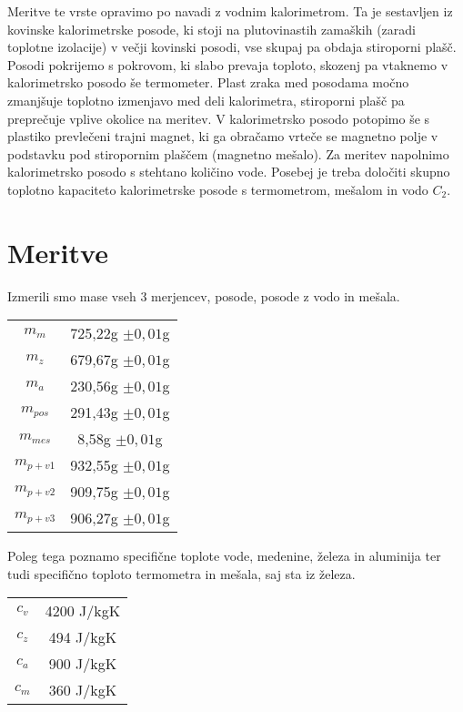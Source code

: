 \documentclass[a4paper]{article}
\begin{document}
Meritve te vrste opravimo po navadi z vodnim kalorimetrom. Ta je sestavljen iz kovinske kalorimetrske posode, ki stoji na plutovinastih zamaških (zaradi toplotne izolacije) v večji kovinski posodi, vse skupaj pa obdaja stiroporni plašč. Posodi pokrijemo s pokrovom, ki slabo prevaja toploto, skozenj pa vtaknemo v kalorimetrsko posodo še termometer. Plast zraka med posodama močno zmanjšuje toplotno izmenjavo med deli kalorimetra, stiroporni plašč pa preprečuje vplive okolice na meritev. V kalorimetrsko posodo potopimo še s plastiko prevlečeni trajni magnet, ki ga obračamo vrteče se magnetno polje v podstavku pod stiropornim plaščem (magnetno mešalo). Za meritev napolnimo kalorimetrsko posodo s stehtano količino vode. Posebej je treba določiti skupno toplotno kapaciteto kalorimetrske posode s termometrom, mešalom in vodo $C_2$.

\section{Meritve}
Izmerili smo mase vseh 3 merjencev, posode, posode z vodo in mešala. 


\begin{center}
\begin{tabular}{ |c|c| } 
 \hline
 $m_m$ & 725,22g $\pm{0,01}$g  \\ 
 $m_z$ & 679,67g $\pm{0,01}$g  \\ 
 $m_a$ & 230,56g $\pm{0,01}$g  \\ 
 $m_{pos}$ & 291,43g $\pm{0,01}$g  \\
 $m_{mes}$ & 8,58g $\pm{0,01}$g  \\
 $m_{p+v1}$ & 932,55g $\pm{0,01}$g  \\
 $m_{p+v2}$ & 909,75g $\pm{0,01}$g  \\
 $m_{p+v3}$ & 906,27g $\pm{0,01}$g  \\

 \hline
\end{tabular}
\end{center}

Poleg tega poznamo specifične toplote vode, medenine, železa in aluminija ter tudi specifično toploto termometra in mešala, saj sta iz železa.

\begin{center}
\begin{tabular}{ |c|c| } 
 \hline
 $c_v$ & 4200 J/kgK  \\ 
 $c_z$ & 494 J/kgK  \\ 
 $c_a$ & 900 J/kgK  \\ 
 $c_m$ & 360 J/kgK  \\ 
 \hline
\end{tabular}
\end{center}
\end{document}
